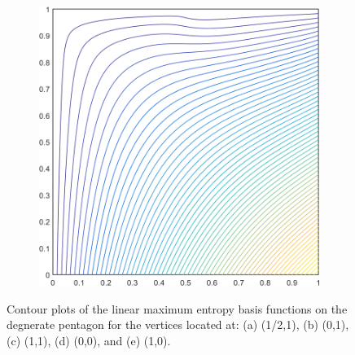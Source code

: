 \begin{figure}
\begin{subfigure}[b]{0.39\textwidth}
		\caption{}
	\end{subfigure}
	\hspace{1.5cm}
	\begin{subfigure}[b]{0.39\textwidth}
		\centering
		\includegraphics[width=\textwidth]{figures/sec_BF/deg_square_MAXENT1_contour_b2.png}
		\caption{}
	\end{subfigure}
\caption{Contour plots of the linear maximum entropy basis functions on the degnerate pentagon for the vertices located at: (a) (1/2,1), (b) (0,1), (c) (1,1), (d) (0,0), and (e) (1,0).}
\end{figure}

